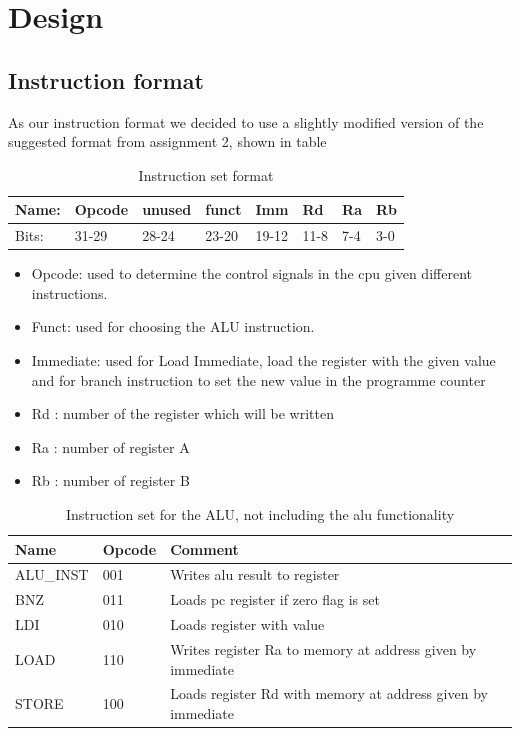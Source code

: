 \documentclass[11pt]{report}
\begin{document}
\section*{Design}

\subsection*{Instruction format}
As our instruction format we decided to use a slightly modified version of the
suggested format from assignment 2, shown in table %

\begin{table}[h]
  \centering
  \begin{tabular}{|l|l|l|l|l|l|l|l|}
    \hline
    Name: 		&	Opcode		&	unused	&	funct	&	Imm		&	Rd		&	Ra	&	Rb	\\\hline
    Bits: 		&	31-29		&	28-24	&	23-20	&	19-12	&	11-8	&	7-4	&	3-0	\\\hline
  \end{tabular}
  \caption{Instruction set format}
\end{table}

 \begin{itemize}
\item Opcode: used to determine the control signals in the cpu given different instructions.	
\item Funct: used for choosing the ALU instruction.
\item Immediate: used for Load Immediate, load the register with the given value and for branch instruction to set the new value in the programme counter
\item Rd : number of the register which will be written
\item Ra : number of register A
\item Rb : number of register B
\end{itemize}

\begin{table}[h]
  \centering
  \begin{tabular}{|l|l|l|}
    \hline
    Name&Opcode&Comment \\
    \hline
    ALU\_INST	&001	&Writes alu result to register\\
    BNZ			&011	&Loads pc register if zero flag is set\\
    LDI			&010	&Loads register with value\\
    LOAD		&110	&Writes register Ra to memory at address given by immediate\\
    STORE		&100	&Loads register Rd with memory at address given by immediate\\
    \hline
  \end{tabular}
  \caption{Instruction set for the ALU, not including the alu functionality}
\end{table}
\end{document}

